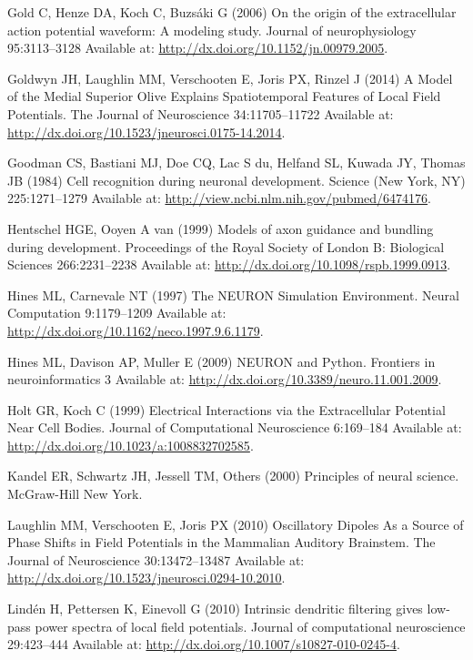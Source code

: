 \documentclass[]{article}
\begin{document}
\hypertarget{ref-Gold2006Origin}{}
Gold C, Henze DA, Koch C, Buzsáki G (2006) On the origin of the
extracellular action potential waveform: A modeling study. Journal of
neurophysiology 95:3113--3128 Available at:
\url{http://dx.doi.org/10.1152/jn.00979.2005}.

\hypertarget{ref-Goldwyn2014Model}{}
Goldwyn JH, Laughlin MM, Verschooten E, Joris PX, Rinzel J (2014) A
Model of the Medial Superior Olive Explains Spatiotemporal Features of
Local Field Potentials. The Journal of Neuroscience 34:11705--11722
Available at: \url{http://dx.doi.org/10.1523/jneurosci.0175-14.2014}.

\hypertarget{ref-Goodman1984Cell}{}
Goodman CS, Bastiani MJ, Doe CQ, Lac S du, Helfand SL, Kuwada JY, Thomas
JB (1984) Cell recognition during neuronal development. Science (New
York, NY) 225:1271--1279 Available at:
\url{http://view.ncbi.nlm.nih.gov/pubmed/6474176}.

\hypertarget{ref-Hentschel1999Models}{}
Hentschel HGE, Ooyen A van (1999) Models of axon guidance and bundling
during development. Proceedings of the Royal Society of London B:
Biological Sciences 266:2231--2238 Available at:
\url{http://dx.doi.org/10.1098/rspb.1999.0913}.

\hypertarget{ref-Hines1997NEURON}{}
Hines ML, Carnevale NT (1997) The NEURON Simulation Environment. Neural
Computation 9:1179--1209 Available at:
\url{http://dx.doi.org/10.1162/neco.1997.9.6.1179}.

\hypertarget{ref-Hines2009NEURON}{}
Hines ML, Davison AP, Muller E (2009) NEURON and Python. Frontiers in
neuroinformatics 3 Available at:
\url{http://dx.doi.org/10.3389/neuro.11.001.2009}.

\hypertarget{ref-Holt1999Electrical}{}
Holt GR, Koch C (1999) Electrical Interactions via the Extracellular
Potential Near Cell Bodies. Journal of Computational Neuroscience
6:169--184 Available at:
\url{http://dx.doi.org/10.1023/a:1008832702585}.

\hypertarget{ref-kandel2000principles}{}
Kandel ER, Schwartz JH, Jessell TM, Others (2000) Principles of neural
science. McGraw-Hill New York.

\hypertarget{ref-Laughlin2010Oscillatory}{}
Laughlin MM, Verschooten E, Joris PX (2010) Oscillatory Dipoles As a
Source of Phase Shifts in Field Potentials in the Mammalian Auditory
Brainstem. The Journal of Neuroscience 30:13472--13487 Available at:
\url{http://dx.doi.org/10.1523/jneurosci.0294-10.2010}.

\hypertarget{ref-Linden2010Intrinsic}{}
Lindén H, Pettersen K, Einevoll G (2010) Intrinsic dendritic filtering
gives low-pass power spectra of local field potentials. Journal of
computational neuroscience 29:423--444 Available at:
\url{http://dx.doi.org/10.1007/s10827-010-0245-4}.
\end{document}
